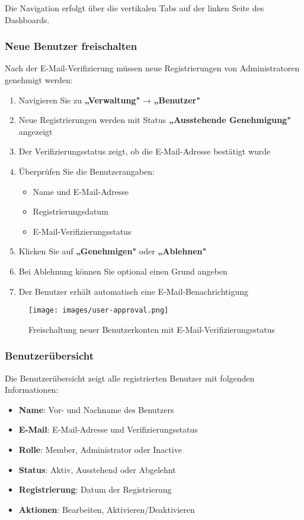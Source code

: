 Die Navigation erfolgt über die vertikalen Tabs auf der linken Seite des Dashboards.

\subsubsection{Neue Benutzer freischalten}

Nach der E-Mail-Verifizierung müssen neue Registrierungen von Administratoren genehmigt werden:

\begin{enumerate}
    \item Navigieren Sie zu \textbf{„Verwaltung"} → \textbf{„Benutzer"}
    \item Neue Registrierungen werden mit Status \textbf{„Ausstehende Genehmigung"} angezeigt
    \item Der Verifizierungsstatus zeigt, ob die E-Mail-Adresse bestätigt wurde
    \item Überprüfen Sie die Benutzerangaben:
        \begin{itemize}
            \item Name und E-Mail-Adresse
            \item Registrierungsdatum
            \item E-Mail-Verifizierungsstatus
        \end{itemize}
    \item Klicken Sie auf \textbf{„Genehmigen"} oder \textbf{„Ablehnen"}
    \item Bei Ablehnung können Sie optional einen Grund angeben
    \item Der Benutzer erhält automatisch eine E-Mail-Benachrichtigung
\end{enumerate}

\begin{figure}[H]
    \centering
    \texttt{[image: images/user-approval.png]}
    \caption{Freischaltung neuer Benutzerkonten mit E-Mail-Verifizierungsstatus}
    \label{fig:user-approval}
\end{figure}

\subsubsection{Benutzerübersicht}

Die Benutzerübersicht zeigt alle registrierten Benutzer mit folgenden Informationen:

\begin{itemize}
    \item \textbf{Name}: Vor- und Nachname des Benutzers
    \item \textbf{E-Mail}: E-Mail-Adresse und Verifizierungsstatus
    \item \textbf{Rolle}: Member, Administrator oder Inactive
    \item \textbf{Status}: Aktiv, Ausstehend oder Abgelehnt
    \item \textbf{Registrierung}: Datum der Registrierung
    \item \textbf{Aktionen}: Bearbeiten, Aktivieren/Deaktivieren
\end{itemize}


